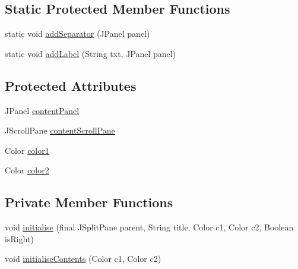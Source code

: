 \subsection*{Static Protected Member Functions}
\begin{DoxyCompactItemize}
\item 
static void \hyperlink{classit_1_1emarolab_1_1cagg_1_1debugging_1_1baseComponents_1_1BaseDebugginGuiPanel_a35c5391d8055e2bb7bf52e74666ea16a}{add\-Separator} (J\-Panel panel)
\item 
static void \hyperlink{classit_1_1emarolab_1_1cagg_1_1debugging_1_1baseComponents_1_1BaseDebugginGuiPanel_ab4b5eaf64d2f13bd0f8d483b530b084f}{add\-Label} (String txt, J\-Panel panel)
\end{DoxyCompactItemize}
\subsection*{Protected Attributes}
\begin{DoxyCompactItemize}
\item 
J\-Panel \hyperlink{classit_1_1emarolab_1_1cagg_1_1debugging_1_1baseComponents_1_1BaseDebugginGuiPanel_a20dd485862372d4f536e47f201386c32}{content\-Panel}
\item 
J\-Scroll\-Pane \hyperlink{classit_1_1emarolab_1_1cagg_1_1debugging_1_1baseComponents_1_1BaseDebugginGuiPanel_add5f4b188d367b9c26806753977e6029}{content\-Scroll\-Pane}
\item 
Color \hyperlink{classit_1_1emarolab_1_1cagg_1_1debugging_1_1baseComponents_1_1BaseDebugginGuiPanel_a9bfa300598258b8c9b1cc59f6051913f}{color1}
\item 
Color \hyperlink{classit_1_1emarolab_1_1cagg_1_1debugging_1_1baseComponents_1_1BaseDebugginGuiPanel_a97cc1e5698f78bfc568be30173e15d65}{color2}
\end{DoxyCompactItemize}
\subsection*{Private Member Functions}
\begin{DoxyCompactItemize}
\item 
void \hyperlink{classit_1_1emarolab_1_1cagg_1_1debugging_1_1baseComponents_1_1BaseDebugginGuiPanel_af993f0617c4c25e21416538a4457a5e2}{initialise} (final J\-Split\-Pane parent, String title, Color c1, Color c2, Boolean is\-Right)
\item 
void \hyperlink{classit_1_1emarolab_1_1cagg_1_1debugging_1_1baseComponents_1_1BaseDebugginGuiPanel_aa38aecfac364c0d5cffb77a5910dab21}{initialise\-Contents} (Color c1, Color c2)
\end{DoxyCompactItemize}
